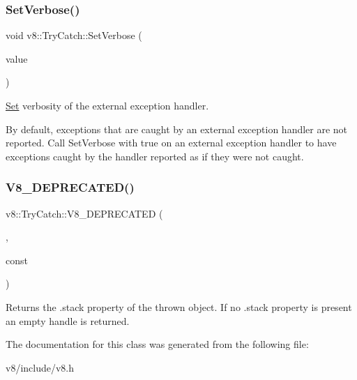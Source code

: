 \subsubsection{\texorpdfstring{Set\+Verbose()}{SetVerbose()}}
{\footnotesize\ttfamily void v8\+::\+Try\+Catch\+::\+Set\+Verbose (\begin{DoxyParamCaption}\item[{bool}]{value }\end{DoxyParamCaption})}

\mbox{\hyperlink{classv8_1_1Set}{Set}} verbosity of the external exception handler.

By default, exceptions that are caught by an external exception handler are not reported. Call Set\+Verbose with true on an external exception handler to have exceptions caught by the handler reported as if they were not caught. \mbox{\label{classv8_1_1TryCatch_a68d99863957fee038877a2d710cd0958}} 
\subsubsection{\texorpdfstring{V8\+\_\+\+D\+E\+P\+R\+E\+C\+A\+T\+E\+D()}{V8\_DEPRECATED()}}
{\footnotesize\ttfamily v8\+::\+Try\+Catch\+::\+V8\+\_\+\+D\+E\+P\+R\+E\+C\+A\+T\+ED (\begin{DoxyParamCaption}\item[{\char`\"{}Use maybe version.\char`\"{}}]{,  }\item[{\mbox{\hyperlink{classv8_1_1Local}{Local}}$<$ \mbox{\hyperlink{classv8_1_1Value}{Value}} $>$ \mbox{\hyperlink{classv8_1_1StackTrace}{Stack\+Trace}}()}]{const }\end{DoxyParamCaption})}

Returns the .stack property of the thrown object. If no .stack property is present an empty handle is returned. 

The documentation for this class was generated from the following file\+:\begin{DoxyCompactItemize}
\item 
v8/include/v8.\+h\end{DoxyCompactItemize}
